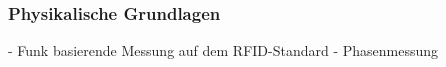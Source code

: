 \begin{frame}
  \frametitle{Physikalische Grundlagen}
	- Funk basierende Messung auf dem RFID-Standard 
	- Phasenmessung
\end{frame}
